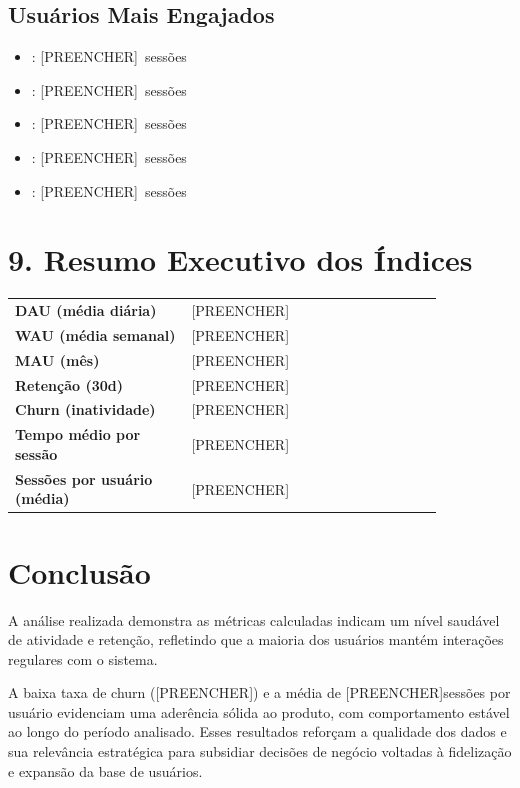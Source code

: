 \documentclass[12pt]{article}
\providecommand{\DAUmedio}{[PREENCHER]}
\providecommand{\WAUMedio}{[PREENCHER]}
\providecommand{\MAU}{[PREENCHER]}
\providecommand{\RetencaoTaxa}{[PREENCHER]}
\providecommand{\ChurnTaxa}{[PREENCHER]}
\providecommand{\TempoMedioHM}{[PREENCHER]}
\providecommand{\SessoesPorUsuario}{[PREENCHER]}
\providecommand{\TopAFone}{[PREENCHER]}\providecommand{\TopASessoes}{[PREENCHER]}
\providecommand{\TopBFone}{[PREENCHER]}\providecommand{\TopBSessoes}{[PREENCHER]}
\providecommand{\TopCFone}{[PREENCHER]}\providecommand{\TopCSessoes}{[PREENCHER]}
\providecommand{\TopDFone}{[PREENCHER]}\providecommand{\TopDSessoes}{[PREENCHER]}
\providecommand{\TopEFone}{[PREENCHER]}\providecommand{\TopESessoes}{[PREENCHER]}
\begin{document}
\subsection*{Usuários Mais Engajados}
\begin{itemize}
  \item \TopAFone: \TopASessoes\ sessões
  \item \TopBFone: \TopBSessoes\ sessões
  \item \TopCFone: \TopCSessoes\ sessões
  \item \TopDFone: \TopDSessoes\ sessões
  \item \TopEFone: \TopESessoes\ sessões
\end{itemize}

\section*{9. Resumo Executivo dos Índices}
\begin{center}
\begin{tabular}{>{\bfseries}p{0.35\linewidth} p{0.5\linewidth}}
\toprule
DAU (média diária) & \DAUmedio \\
WAU (média semanal) & \WAUMedio \\
MAU (mês) & \MAU \\
Retenção (30d) & \RetencaoTaxa \\
Churn (inatividade) & \ChurnTaxa \\
Tempo médio por sessão & \TempoMedioHM \\
Sessões por usuário (média) & \SessoesPorUsuario \\
\bottomrule
\end{tabular}
\end{center}

\section*{Conclusão}
A análise realizada demonstra as métricas calculadas indicam um nível saudável de atividade e retenção, refletindo que a maioria dos usuários mantém interações regulares com o sistema.

A baixa taxa de churn (\ChurnTaxa) e a média de \SessoesPorUsuario sessões por usuário evidenciam uma aderência sólida ao produto, com comportamento estável ao longo do período analisado. Esses resultados reforçam a qualidade dos dados e sua relevância estratégica para subsidiar decisões de negócio voltadas à fidelização e expansão da base de usuários.
\end{document}
